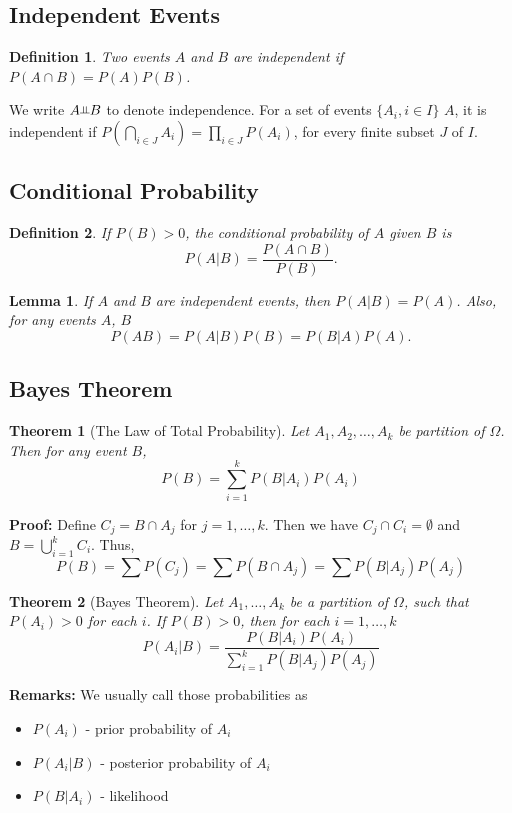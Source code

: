 \documentclass[11pt]{article}
\newtheorem{theorem}{Theorem}[section]
\newtheorem{lemma}{Lemma}[section]
\newtheorem{definition}{Definition}[section]
\def\probin{\mbox{\rotatebox[origin=c]{90}{$\vDash$}}}
\begin{document}
\subsection{Independent Events}
\begin{definition}
Two events $A$ and $B$ are independent if $P(A\cap B) = P(A)P(B)$.
\end{definition}
We write $A \probin B$ to denote independence. For a set of events $\{A_i, i\in I\}$ $A$, it is
independent if $P(\bigcap_{i\in J}A_i) = \prod_{i\in J}P(A_i)$, for
every finite subset $J$ of $I$.

\subsection{Conditional Probability}
\begin{definition}
If $P(B) > 0$, the conditional probability of $A$ given $B$ is
\[P(A|B) = \frac{P(A\cap B)}{P(B)}.\]
\end{definition}

\begin{lemma}
If $A$ and $B$ are independent events, then $P(A|B) = P(A)$. Also, for any events $A$, $B$
\[P(AB) = P(A|B)P(B) = P(B|A)P(A).\]
\end{lemma}

\subsection{Bayes Theorem}
\begin{theorem}[The Law of Total Probability]
Let $A_1, A_2, \dots, A_k$ be partition of $\Omega$. Then
for any event $B$,
\[P(B) = \sum_{i=1}^k P(B|A_i)P(A_i)\]
\end{theorem}
{\bf Proof: } Define $C_j = B\cap A_j$ for $j = 1, \dots, k$.
Then we have $C_j \cap C_i = \emptyset$ and $B = \bigcup_{i = 1}^k C_i$.
Thus,\[P(B) = \sum P(C_j) = \sum P(B\cap A_j) = \sum P(B|A_j)P(A_j)\]

\begin{theorem}[Bayes Theorem]
Let $A_1, \dots, A_k$ be a partition of $\Omega$, such that $P(A_i) > 0$ for each $i$.
If $P(B) > 0$, then for each $i = 1, \dots, k$
\[P(A_i|B) = \frac{P(B|A_i)P(A_i)}{\sum_{i=1}^kP(B|A_j)P(A_j)}\]
\end{theorem}
{\bf Remarks:} We usually call those probabilities as
\begin{itemize}
\item $P(A_i)$ - prior probability of $A_i$
\item $P(A_i|B)$ - posterior probability of $A_i$
\item $P(B|A_i)$ - likelihood
\end{itemize}
\end{document}
